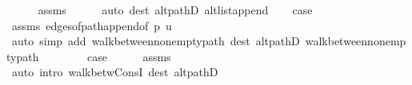 \begin{isabellebody}
\ \ \ \ \isamarkupfalse%
\ assms{\isacharparenleft}{\kern0pt}{}{\isacharparenright}{\kern0pt}\isanewline
\ \ \ \ \isamarkupfalse%
\ {\isacharparenleft}{\kern0pt}auto\ dest{\isacharcolon}{\kern0pt}\ alt{\isacharunderscore}{\kern0pt}pathD{\isacharparenleft}{\kern0pt}{}{\isacharparenright}{\kern0pt}\ alt{\isacharunderscore}{\kern0pt}list{\isacharunderscore}{\kern0pt}append{\isacharunderscore}{\kern0pt}{}{\isacharparenright}{\kern0pt}\isanewline
\ \ \isamarkupfalse%
\ {\isacharquery}{\kern0pt}case\isanewline
\ \ \ \ \isamarkupfalse%
\ assms{\isacharparenleft}{\kern0pt}{}{\isacharparenright}{\kern0pt}\ edges{\isacharunderscore}{\kern0pt}of{\isacharunderscore}{\kern0pt}path{\isacharunderscore}{\kern0pt}append{\isacharunderscore}{\kern0pt}{}{\isacharbrackleft}{\kern0pt}of\ p\ {\isachardoublequoteopen}{\isacharbrackleft}{\kern0pt}u{\isacharbrackright}{\kern0pt}{\isachardoublequoteclose}{\isacharbrackright}{\kern0pt}\isanewline
\ \ \ \ \isamarkupfalse%
\ {\isacharparenleft}{\kern0pt}auto\ simp\ add{\isacharcolon}{\kern0pt}\ walk{\isacharunderscore}{\kern0pt}between{\isacharunderscore}{\kern0pt}nonempty{\isacharunderscore}{\kern0pt}path{\isacharparenleft}{\kern0pt}{}{\isacharparenright}{\kern0pt}\ dest{\isacharcolon}{\kern0pt}\ alt{\isacharunderscore}{\kern0pt}pathD{\isacharparenleft}{\kern0pt}{}{\isacharparenright}{\kern0pt}\ walk{\isacharunderscore}{\kern0pt}between{\isacharunderscore}{\kern0pt}nonempty{\isacharunderscore}{\kern0pt}path{\isacharparenleft}{\kern0pt}{}{\isacharparenright}{\kern0pt}{\isacharparenright}{\kern0pt}\isanewline
{}\isamarkupfalse%
\isanewline
\ \ \isamarkupfalse%
\ {}\isanewline
\ \ \isamarkupfalse%
\ {\isacharquery}{\kern0pt}case\isanewline
\ \ \ \ \isamarkupfalse%
\ assms{\isacharparenleft}{\kern0pt}{}{\isacharcomma}{\kern0pt}\ {}{\isacharparenright}{\kern0pt}\isanewline
\ \ \ \ \isamarkupfalse%
\ {\isacharparenleft}{\kern0pt}auto\ intro{\isacharcolon}{\kern0pt}\ walk{\isacharunderscore}{\kern0pt}betw{\isacharunderscore}{\kern0pt}ConsI\ dest{\isacharcolon}{\kern0pt}\ alt{\isacharunderscore}{\kern0pt}pathD{\isacharparenleft}{\kern0pt}{}{\isacharparenright}{\kern0pt}{\isacharparenright}{\kern0pt}\isanewline
{}\isamarkupfalse%
%
\endisatagproof
{\isafoldproof}%
%
\isadelimproof
\isanewline
%
\endisadelimproof
%
\isadeliminvisible

\end{isabellebody}
